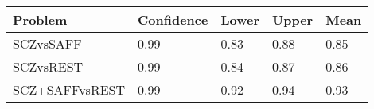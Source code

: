 \begin{tabular}{L{1in}|L{1in}|L{1in}|L{1in}|L{1in}}
 Problem & Confidence & Lower & Upper & Mean \\\hline
SCZvsSAFF&0.99&0.83&0.88&0.85\\\hline
SCZvsREST&0.99&0.84&0.87&0.86\\\hline
SCZ+SAFFvsREST&0.99&0.92&0.94&0.93\\\hline
\end{tabular}
